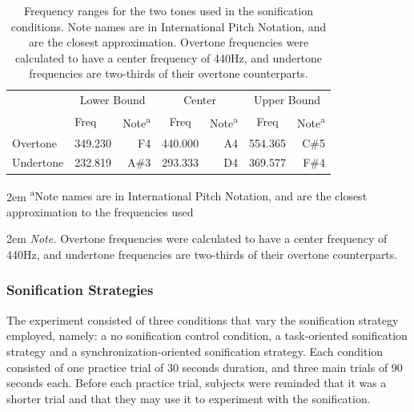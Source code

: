 \documentclass[10pt,a4paper,onecolumn]{article}
\begin{document}
\begin{table}[!h]

\begin{threeparttable}
\caption{\label{tab:frequency-ranges}Frequency ranges for the two tones used in the sonification conditions. Note names are in International Pitch Notation, and are the closest approximation. Overtone frequencies were calculated to have a center frequency of 440Hz, and undertone frequencies are two-thirds of their overtone counterparts.}
\centering
\fontsize{7}{9}\selectfont
\begin{tabular}[t]{>{}l>{}l>{}r>{}c>{}r>{}c>{}r}
\toprule
\multicolumn{1}{c}{} & \multicolumn{2}{c}{Lower Bound} & \multicolumn{2}{c}{Center} & \multicolumn{2}{c}{Upper Bound} \\
\cmidrule(l{3pt}r{3pt}){2-3} \cmidrule(l{3pt}r{3pt}){4-5} \cmidrule(l{3pt}r{3pt}){6-7}
  & Freq & Note\textsuperscript{a} & Freq & Note\textsuperscript{a} & Freq & Note\textsuperscript{a}\\
\midrule
Overtone & 349.230 & F4 & 440.000 & A4 & 554.365 & C\#5\\
Undertone & 232.819 & A\#3 & 293.333 & D4 & 369.577 & F\#4\\
\bottomrule
\end{tabular}
\begin{tablenotes}
\small
\item [] 
\rightskip2em
{\footnotesize \sffamily \textsuperscript{a}Note names are in International Pitch Notation, and are the closest approximation to the frequencies used}
\item [] 
\rightskip2em
{\footnotesize \sffamily \textit{Note.} Overtone frequencies were calculated to have a center frequency of 440Hz, and undertone frequencies are two-thirds of their overtone counterparts.}
\end{tablenotes}
\end{threeparttable}
\end{table}

\hypertarget{sonification-strategies}{%
\subsubsection{Sonification Strategies}\label{sonification-strategies}}

The experiment consisted of three conditions that vary the sonification strategy employed, namely: a no sonification control condition, a task-oriented sonification strategy and a synchronization-oriented sonification strategy. Each condition consisted of one practice trial of 30 seconds duration, and three main trials of 90 seconds each. Before each practice trial, subjects were reminded that it was a shorter trial and that they may use it to experiment with the sonification.
\end{document}
